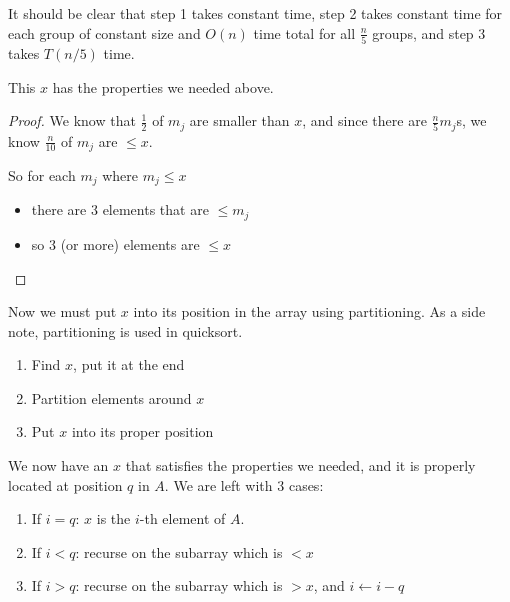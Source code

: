 It should be clear that step 1 takes constant time, step 2 takes
constant time for each group of constant size and $O(n)$ time total
for all $\frac{n}{5}$ groups, and step 3 takes $T(n/5)$ time.

\begin{claim}
This $x$ has the properties we needed above.
\end{claim}

\begin{proof}

We know that $\frac{1}{2}$ of $m_j$ are smaller than $x$, and since
there are $ \frac{n}{5} m_j$s, we know $\frac{n}{10}$ of $m_j$ are $
\leq x $.

So for each $m_j$ where $m_j \leq x$ 

\begin{itemize} 

\item there are 3 elements that are $ \leq m_j $
\item so 3 (or more) elements are $ \leq x $

\end{itemize}
%
\end{proof}
%
Now we must put $x$ into its position in the array using partitioning.
As a side note, partitioning is used in quicksort.

\begin{enumerate}

\item Find $x$, put it at the end
\item Partition elements around $x$
\item Put $x$ into its proper position

\end{enumerate}

We now have an $x$ that satisfies the properties we needed, and it is
properly located at position $q$ in $A$.  We are left with 3 cases:

\begin{enumerate}

\item If $i = q$: $x$ is the $i$-th element of $A$.
\item If $i < q$: recurse on the subarray which is $ < x $

\item If $i > q$: recurse on the subarray which is $ > x $, and $ i
  \leftarrow i - q $

\end{enumerate}

